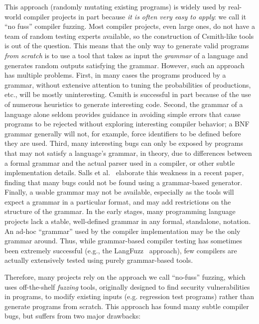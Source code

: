 This approach (randomly mutating existing programs) is widely used by
real-world compiler projects in part because \emph{it is often very easy to
  apply}: we call it ``no fuss'' compiler fuzzing.  Most compiler projects, even large ones, do not have a team
of random testing experts available, so the construction of
Csmith-like tools is out of the question.  This means that the only
way to generate valid programs \emph{from scratch} is to use a tool that takes as
input the \emph{grammar} of a language and generates random outputs
satisfying the grammar.   However, such an approach has multiple problems.
First, in many cases the programs produced by a grammar, without
extensive attention to tuning the probabilities of productions, etc., will be mostly uninteresting.
Csmith is successful in part because of the use of numerous heuristics
to generate interesting code.  Second, the grammar of a language alone
seldom provides guidance in avoiding simple errors that cause programs
to be rejected without exploring interesting compiler behavior; a BNF
grammar generally will not, for example, force identifiers to be
defined before they are used.  Third, many interesting bugs can only
be exposed by programs that may not satisfy a language's grammar, in
theory, due to differences between a formal grammar and the actual
parser used in a compiler, or other subtle implementation details.
Salls et al.~\cite{Salls2021TokenLevel} elaborate this weakness in a
recent paper, finding that many bugs could not be found using a
grammar-based generator.
Finally, a usable grammar may not be available, especially as the
tools will expect a grammar in a particular format, and may add
restrictions on the structure of the grammar.  In the early stages,
many programming language projects lack a stable, well-defined
grammar in any formal, standalone, notation.  An ad-hoc ``grammar'' used by the compiler implementation may be the
only grammar around.  Thus, while grammar-based compiler
testing has sometimes been extremely successful (e.g., the
LangFuzz~\cite{LangFuzz} approach), few compilers are actually
extensively tested using purely grammar-based tools.

Therefore, many projects rely on the approach we call ``no-fuss''
fuzzing, which uses off-the-shelf \emph{fuzzing} tools,
originally designed to find security vulnerabilities in programs, to
modify existing inputs (e.g. regression test programs) rather than generate programs from
scratch.  This approach has found many subtle compiler bugs, but
suffers from two major drawbacks:

